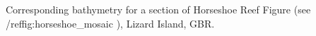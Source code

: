 \label{fig:horseshoe_depth}Corresponding bathymetry for a section of Horseshoe Reef Figure (see /ref{fig:horseshoe_mosaic} ), Lizard Island, GBR.